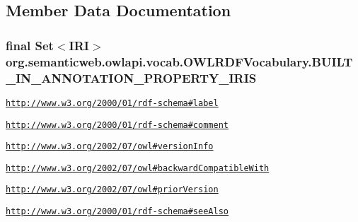 \subsection{Member Data Documentation}
\hypertarget{enumorg_1_1semanticweb_1_1owlapi_1_1vocab_1_1_o_w_l_r_d_f_vocabulary_a14df9bf25a33807156fe353b6ab3cdfa}{
\subsubsection[{B\-U\-I\-L\-T\-\_\-\-I\-N\-\_\-\-A\-N\-N\-O\-T\-A\-T\-I\-O\-N\-\_\-\-P\-R\-O\-P\-E\-R\-T\-Y\-\_\-\-I\-R\-I\-S}]{\setlength{\rightskip}{0pt plus 5cm}final Set$<${\bf I\-R\-I}$>$ org.\-semanticweb.\-owlapi.\-vocab.\-O\-W\-L\-R\-D\-F\-Vocabulary.\-B\-U\-I\-L\-T\-\_\-\-I\-N\-\_\-\-A\-N\-N\-O\-T\-A\-T\-I\-O\-N\-\_\-\-P\-R\-O\-P\-E\-R\-T\-Y\-\_\-\-I\-R\-I\-S\hspace{0.3cm}{\ttfamily [static]}}}\label{enumorg_1_1semanticweb_1_1owlapi_1_1vocab_1_1_o_w_l_r_d_f_vocabulary_a14df9bf25a33807156fe353b6ab3cdfa}
\href{http://www.w3.org/2000/01/rdf-schema#label}{\tt http\-://www.\-w3.\-org/2000/01/rdf-\/schema\#label} \par
 \href{http://www.w3.org/2000/01/rdf-schema#comment}{\tt http\-://www.\-w3.\-org/2000/01/rdf-\/schema\#comment} \par
 \href{http://www.w3.org/2002/07/owl#versionInfo}{\tt http\-://www.\-w3.\-org/2002/07/owl\#version\-Info} \par
 \href{http://www.w3.org/2002/07/owl#backwardCompatibleWith}{\tt http\-://www.\-w3.\-org/2002/07/owl\#backward\-Compatible\-With} \par
 \href{http://www.w3.org/2002/07/owl#priorVersion}{\tt http\-://www.\-w3.\-org/2002/07/owl\#prior\-Version} \par
 \href{http://www.w3.org/2000/01/rdf-schema#seeAlso}{\tt http\-://www.\-w3.\-org/2000/01/rdf-\/schema\#see\-Also} \par
